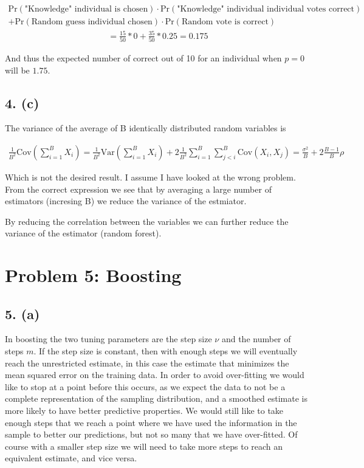 \documentclass[a4paper, 10pt, english]{article}
\begin{document}
\begin{align*}
    \text{Pr}(\text{"Knowledge" individual is chosen})
    \cdot
    \text{Pr}(\text{"Knowledge" individual individual votes correct})
    \\+
    \text{Pr}(\text{Random guess individual chosen})
    \cdot
    \text{Pr}(\text{Random vote is correct})
\end{align*}
\begin{align*}
    = \frac{15}{50}*0 + \frac{35}{50}*0.25 = 0.175
\end{align*}

And thus the expected number of correct out of 10 for an individual when $p = 0$ will be $1.75$.


\subsection{4. (c)}
The variance of the average of B identically distributed random variables is

\begin{align*}
    \frac{1}{B^2}
    \text{Cov}(\sum_{i=1}^B X_i)
    =
    \frac{1}{B^2}
    \text{Var}(\sum_{i=1}^B X_i)
    +
    2 \frac{1}{B^2}
    \sum_{i=1}^B \sum_{j<i}^B \text{Cov}(X_i, X_j)
    =
    \frac{\sigma^2}{B}
    +
    2\frac{B-1}{B} \rho
\end{align*}

Which is not the desired result. I assume I have looked at the wrong problem. 
From the correct expression we see that by averaging a large number of estimators (incresing B) we reduce the
variance of the estmiator.

By reducing the correlation between the variables we can further reduce the variance of the estimator (random
forest).




\section{Problem 5: Boosting}
\subsection{5. (a)}
In boosting the two tuning parameters are the step size $\nu$ and the number of steps $m$. If the step size is
constant, then with enough steps we will eventually reach the unrestricted estimate, in this case the estimate
that minimizes the mean squared error on the training data. In order to avoid over-fitting we would like to
stop at a point before this occurs, as we expect the data to not be a complete representation of the sampling
distribution, and a smoothed estimate is more likely to have better predictive properties. We would still like
to take enough steps that we reach a point where we have used the information in the sample to better our
predictions, but not so many that we have over-fitted. Of course with a smaller step size we will need to take
more steps to reach an equivalent estimate, and vice versa.
\end{document}
